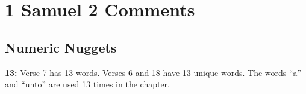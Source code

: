 \section{1 Samuel 2 Comments}

\subsection{Numeric Nuggets}
\textbf{13: } Verse 7 has 13 words. Verses 6 and 18 have 13 unique words. The words ``a'' and ``unto'' are used 13 times in the chapter.